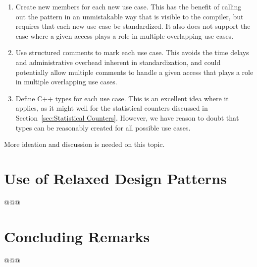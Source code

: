 \documentclass{article}
\begin{document}
\begin{enumerate}
\item	Create new   members for each new
	use case.
	This has the benefit of calling out the pattern in an unmistakable
	way that is visible to the compiler, but requires that each
	new use case be standardized.
	It also does not support the case where a given access plays a
	role in multiple overlapping use cases.
\item	Use structured comments to mark each use case.
	This avoids the time delays and administrative overhead inherent
	in standardization, and could potentially allow multiple comments
	to handle a given access that plays a role in multiple overlapping
	use cases.
\item	Define C++  types for each use case.
	This is an excellent idea where it applies, as it might well
	for the statistical counters discussed in
	Section~\ref{sec:Statistical Counters}.
	However, we have reason to doubt that  types can
	be reasonably created for all possible use cases.
\end{enumerate}

More ideation and discussion is needed on this topic.

\section{Use of Relaxed Design Patterns}
\label{sec:Use of Relaxed Design Patterns}

@@@

\section{Concluding Remarks}
\label{sec:Concluding Remarks}

@@@




\end{document}
